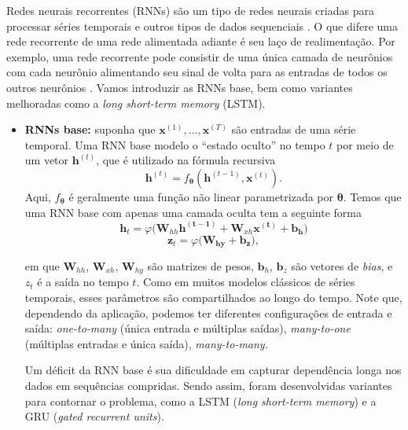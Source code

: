 \documentclass{automatextcc}
\newcommand{\bs}[1]{\boldsymbol{#1}}
\begin{document}
Redes neurais recorrentes (RNNs) são um tipo de redes neurais criadas para processar séries temporais e outros tipos de dados sequenciais \citep{fan2021}. O que difere uma rede recorrente de uma rede alimentada adiante é seu laço de realimentação. Por exemplo, uma rede recorrente pode consistir de uma única camada de neurônios com cada neurônio alimentando seu sinal de volta para as entradas de todos os outros neurônios \citep{haykin2001}. Vamos introduzir as RNNs base, bem como variantes melhoradas como a \textit{long short-term memory} (LSTM).


\begin{itemize}
    \item \textbf{RNNs base:} suponha que $\bs{x}^{(1)},\dots,\bs{x}^{(T)}$ são entradas de uma série temporal. Uma RNN base modelo o ``estado oculto'' no tempo $t$ por meio de um vetor $\bs{h}^{(t)}$, que é utilizado na fórmula recursiva 
    \begin{equation}
        \label{recursive_formula}
        \bs{h}^{(t)} = f_{\bs{\theta}} (\bs{h}^{(t-1)},\bs{x}^{(t)}).
    \end{equation}
    Aqui, $f_{\bs{\theta}}$ é geralmente uma função não linear parametrizada por $\bs{\theta}$. Temos que uma RNN base com apenas uma camada oculta tem a seguinte forma
    \begin{equation}
        \bs{h}_{t} = \varphi \bigl( \bs{W}_{hh} \bs{h^{(t-1)}} + \bs{W}_{xh} \bs{x^{(t)}} + \bs{b_h} \bigl)
    \end{equation}
    \begin{equation}
        \bs{z}_t = \varphi \bigl( \bs{W_{hy}} + \bs{b_z} \bigl),
    \end{equation}
    
    em que $\bs{W}_{hh}$, $\bs{W}_{xh}$, $\bs{W}_{hy}$ são  matrizes de pesos, $\bs{b}_{h}$, $\bs{b}_{z}$ são vetores de \textit{bias}, e $z_t$ é a saída no tempo $t$. Como em muitos modelos clássicos de séries temporais, esses parâmetros são compartilhados ao longo do tempo. Note que, dependendo da aplicação, podemos ter diferentes configurações de entrada e saída: \textit{one-to-many} (única entrada e múltiplas saídas), \textit{many-to-one} (múltiplas entradas e única saída), \textit{many-to-many}. 
    
    Um déficit da RNN base é sua dificuldade em capturar dependência longa nos dados em sequências compridas. Sendo assim, foram desenvolvidas variantes para contornar o problema, como a LSTM (\textit{long short-term memory}) e a GRU (\textit{gated recurrent units}).
    

\end{itemize}
\end{document}
